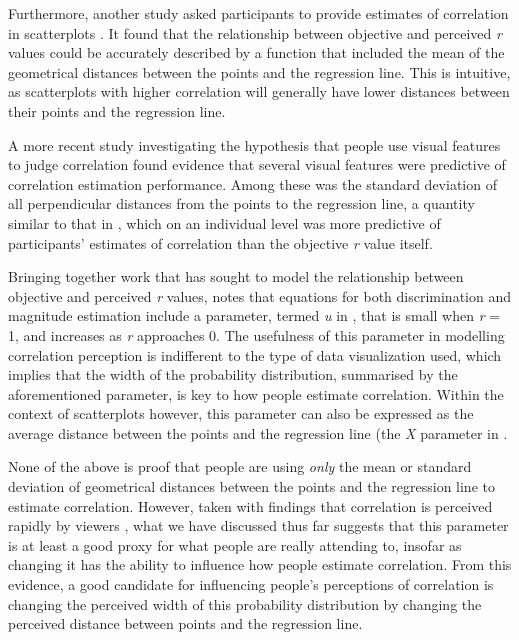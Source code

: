 \documentclass[preprint, 3p,
authoryear]{elsarticle} %
\begin{document}
Furthermore, another study asked participants to provide estimates of
correlation in scatterplots \citep{meyer_1997}. It found that the
relationship between objective and perceived \emph{r} values could be
accurately described by a function that included the mean of the
geometrical distances between the points and the regression line. This
is intuitive, as scatterplots with higher correlation will generally
have lower distances between their points and the regression line.

A more recent study investigating the hypothesis that people use visual
features to judge correlation \citep{yang_2019} found evidence that
several visual features were predictive of correlation estimation
performance. Among these was the standard deviation of all perpendicular
distances from the points to the regression line, a quantity similar to
that in \citet{meyer_1997}, which on an individual level was more
predictive of participants' estimates of correlation than the objective
\emph{r} value itself.

Bringing together work that has sought to model the relationship between
objective and perceived \emph{r} values, \citet{rensink_2017} notes that
equations for both discrimination and magnitude estimation include a
parameter, termed \emph{u} in \citet{rensink_2017}, that is small when
\emph{r} = 1, and increases as \emph{r} approaches 0. The usefulness of
this parameter in modelling correlation perception is indifferent to the
type of data visualization used, which implies that the width of the
probability distribution, summarised by the aforementioned parameter, is
key to how people estimate correlation. Within the context of
scatterplots however, this parameter can also be expressed as the
average distance between the points and the regression line (the
\emph{X} parameter in \citep{meyer_1997}.

None of the above is proof that people are using \emph{only} the mean or
standard deviation of geometrical distances between the points and the
regression line to estimate correlation. However, taken with findings
that correlation is perceived rapidly by viewers \citep{rensink_2014},
what we have discussed thus far suggests that this parameter is at least
a good proxy for what people are really attending to, insofar as
changing it has the ability to influence how people estimate
correlation. From this evidence, a good candidate for influencing
people's perceptions of correlation is changing the perceived width of
this probability distribution by changing the perceived distance between
points and the regression line.
\end{document}

